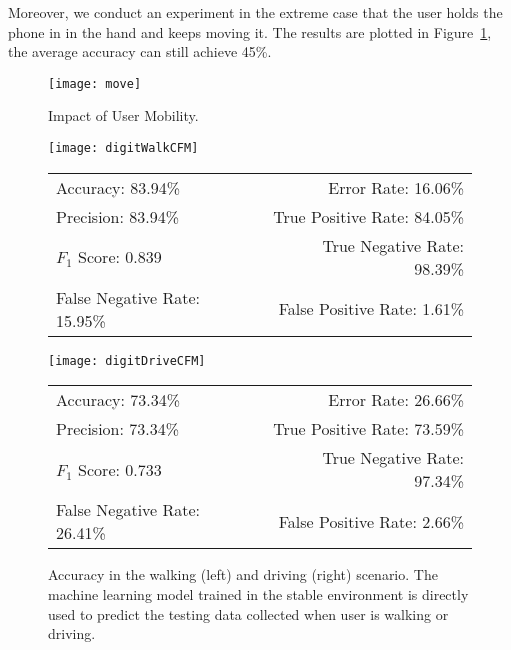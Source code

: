 Moreover, we conduct an experiment in the extreme case that the user holds the phone in in the hand and keeps moving it. The results are plotted in Figure~\ref{fig:move}, the average accuracy can still achieve 45\%.

\begin{figure}[!h]
	\centering
	\texttt{[image: move]}
	\caption{Impact of User Mobility.}
	\label{fig:move}
\end{figure}


\begin{landscape}
	\begin{figure}[!h]
		\centering
		\begin{minipage}[c]{.48\linewidth}
			\centering
			\texttt{[image: digitWalkCFM]}
			\begin{tabular}{lr}
				\toprule
				Accuracy: 83.94\% & \hspace{-.00in} Error Rate: 16.06\% \\
				Precision: 83.94\% & \hspace{-.00in} True Positive Rate: 84.05\% \\
				$F_1$ Score: 0.839 & \hspace{-.00in} True Negative Rate: 98.39\% \\
				False Negative Rate: 15.95\%  & \hspace{-.00in} False Positive Rate: 1.61\% \\
				\bottomrule
			\end{tabular}
		\end{minipage}
		\begin{minipage}[c]{.48\linewidth}
			\centering
			\texttt{[image: digitDriveCFM]}
			\begin{tabular}{lr}
				\toprule
				Accuracy: 73.34\% & \hspace{-.00in} Error Rate: 26.66\% \\
				Precision: 73.34\% & \hspace{-.00in} True Positive Rate: 73.59\% \\
				$F_1$ Score: 0.733 & \hspace{-.00in} True Negative Rate: 97.34\% \\
				False Negative Rate: 26.41\%  & \hspace{-.00in} False Positive Rate: 2.66\% \\
				\bottomrule
			\end{tabular}
		\end{minipage}
		\caption[Accuracy in the walking (left) and driving (right) scenario.]{Accuracy in the walking (left) and driving (right) scenario. The machine learning model trained in the stable environment is directly used to predict the testing data collected when user is walking or driving.}
		\label{fig: walkanddrive}
	\end{figure}
\end{landscape}




